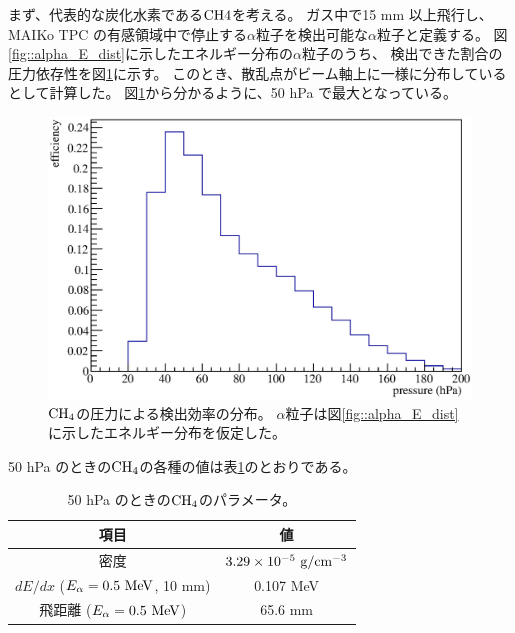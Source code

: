 まず、代表的な炭化水素である${\rm CH{4}}$を考える。
ガス中で15 mm 以上飛行し、MAIKo TPC の有感領域中で停止する$\alpha$粒子を検出可能な$\alpha$粒子と定義する。
図\ref{fig::alpha_E_dist}に示したエネルギー分布の$\alpha$粒子のうち、
検出できた割合の圧力依存性を図\ref{fig::efficiency_P_dist}に示す。
このとき、散乱点がビーム軸上に一様に分布しているとして計算した。
図\ref{fig::efficiency_P_dist}から分かるように、50 hPa で最大となっている。
\begin{figure}
  \centering
  \includegraphics[clip, width=0.7\columnwidth]{eps/efficiency_P_dist.eps}
  \caption[${\rm CH_{4}}$の圧力による検出効率の分布。]
          {${\rm CH_{4}}$の圧力による検出効率の分布。
            $\alpha$粒子は図\ref{fig::alpha_E_dist}に示したエネルギー分布を仮定した。
           }
  \label{fig::efficiency_P_dist}
\end{figure}
50 hPa のときの${\rm CH_{4}}$の各種の値は表\ref{tab::CH4_50_params}のとおりである。
\begin{table}
  \centering
  \caption{50 hPa のときの${\rm CH_{4}}$のパラメータ。}
  \label{tab::CH4_50_params}
  \begin{tabular}{cc}
    \toprule
    項目 & 値\\
    \midrule
    密度 & $3.29\times10^{-5}~{\rm g/cm^{-3}}$\\
    $dE/dx$ ($E_{\alpha} = 0.5~{\rm MeV}$, 10 mm) & 0.107 MeV\\
    飛距離 ($E_{\alpha} = 0.5~{\rm MeV}$) & 65.6 mm \\
    \bottomrule
  \end{tabular}
\end{table}

